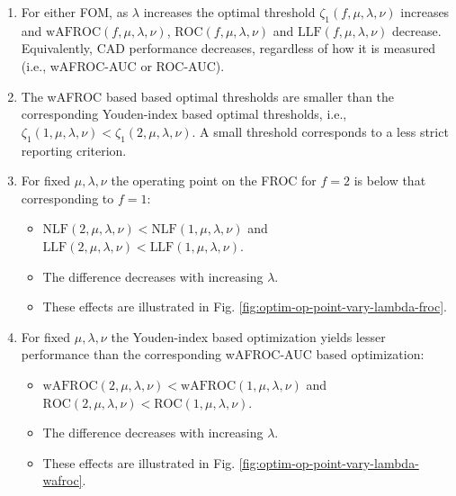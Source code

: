 \documentclass[
]{book}
\providecommand{\tightlist}{%
  \setlength{\itemsep}{0pt}\setlength{\parskip}{0pt}}
\begin{document}
\begin{enumerate}
\def\labelenumi{\arabic{enumi}.}
\item
  For either FOM, as \(\lambda\) increases the optimal threshold \(\zeta_{1} \left ( f, \mu, \lambda, \nu \right )\) increases and \(\text{wAFROC} \left ( f, \mu, \lambda, \nu \right )\), \(\text{ROC} \left ( f, \mu, \lambda, \nu \right )\) and \(\text{LLF} \left ( f, \mu, \lambda, \nu \right )\) decrease. Equivalently, CAD performance decreases, regardless of how it is measured (i.e., wAFROC-AUC or ROC-AUC).
\item
  The wAFROC based based optimal thresholds are smaller than the corresponding Youden-index based optimal thresholds, i.e., \(\zeta_{1} \left ( 1, \mu, \lambda, \nu \right ) < \zeta_{1} \left ( 2, \mu, \lambda, \nu \right )\). A small threshold corresponds to a less strict reporting criterion.
\item
  For fixed \(\mu, \lambda, \nu\) the operating point on the FROC for \(f = 2\) is below that corresponding to \(f = 1\):

  \begin{itemize}
  \tightlist
  \item
    \(\text{NLF} \left (2, \mu, \lambda, \nu \right ) < \text{NLF} \left (1, \mu, \lambda, \nu \right )\) and \(\text{LLF} \left (2, \mu, \lambda, \nu \right ) < \text{LLF} \left (1, \mu, \lambda, \nu \right )\).
  \item
    The difference decreases with increasing \(\lambda\).
  \item
    These effects are illustrated in Fig. \ref{fig:optim-op-point-vary-lambda-froc}.
  \end{itemize}
\item
  For fixed \(\mu, \lambda, \nu\) the Youden-index based optimization yields lesser performance than the corresponding wAFROC-AUC based optimization:

  \begin{itemize}
  \tightlist
  \item
    \(\text{wAFROC} \left (2, \mu, \lambda, \nu \right ) < \text{wAFROC} \left (1, \mu, \lambda, \nu \right )\) and \(\text{ROC} \left (2, \mu, \lambda, \nu \right ) < \text{ROC} \left (1, \mu, \lambda, \nu \right )\).
  \item
    The difference decreases with increasing \(\lambda\).
  \item
    These effects are illustrated in Fig. \ref{fig:optim-op-point-vary-lambda-wafroc}.
  \end{itemize}
\end{enumerate}
\end{document}
